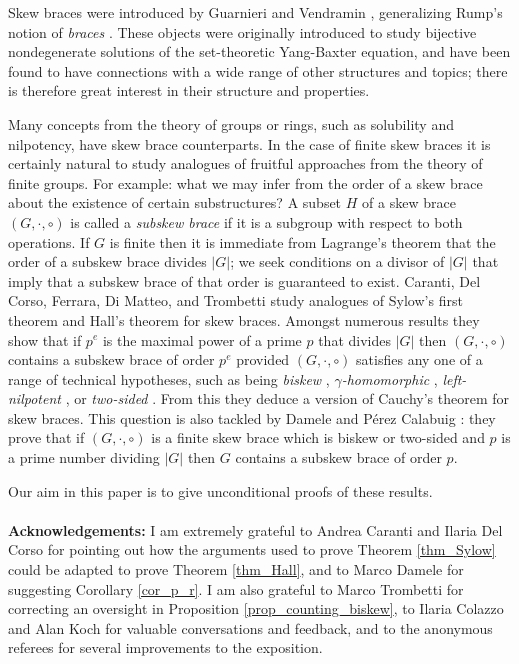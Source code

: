 \documentclass[12pt,a4paper, reqno]{amsart}
\theoremstyle{definition}
\begin{document}
Skew braces were introduced by Guarnieri and Vendramin \cite{GV17}, generalizing Rump's notion of \textit{braces} \cite{Ru07a}. These objects were originally introduced to study bijective nondegenerate solutions of the set-theoretic Yang-Baxter equation, and have been found to have connections with a wide range of other structures and topics; there is therefore great interest in their structure and properties. 

Many concepts from the theory of groups or rings, such as solubility and nilpotency, have skew brace counterparts. In the case of finite skew braces it is certainly natural to study analogues of fruitful approaches from the theory of finite groups. For example: what we may infer from the order of a skew brace about the existence of certain substructures? A subset $ H $ of a skew brace $ (G,\cdot,\circ) $ is called a \textit{subskew brace} if it is a subgroup with respect to both operations. If $ G $ is finite then it is immediate from Lagrange's theorem that the order of a subskew brace divides $ |G| $; we seek conditions on a divisor of $ |G| $ that imply that a subskew brace of that order is guaranteed to exist. Caranti, Del Corso, Ferrara, Di Matteo, and Trombetti \cite{CCMFT25} study analogues of Sylow's first theorem and Hall's theorem for skew braces. Amongst numerous results they show that if $ p^{e} $ is the maximal power of a prime $ p $ that divides $ |G| $ then $ (G,\cdot,\circ) $ contains a subskew brace of order $ p^{e} $ provided $ (G,\cdot,\circ) $ satisfies any one of a range of technical hypotheses, such as being \textit{biskew}  \cite{Ch19b}, \textit{$\gamma$-homomorphic} \cite{BNY22}, \textit{left-nilpotent} \cite{CSV19}, or \textit{two-sided} \cite{Tra23}. From this they deduce a version of Cauchy's theorem for skew braces. This question is also tackled by Damele and P\'{e}rez Calabuig \cite{DPC26}: they prove that if $ (G,\cdot,\circ) $ is a finite skew brace which is biskew or two-sided and $ p $ is a prime number dividing $ |G| $ then $ G $ contains a subskew brace of order $ p $. 

Our aim in this paper is to give unconditional proofs of these results. 
\\ \\
\textbf{Acknowledgements:} I am extremely grateful to Andrea Caranti and Ilaria Del Corso for pointing out how the arguments used to prove Theorem \ref{thm_Sylow} could be adapted to prove Theorem \ref{thm_Hall}, and to Marco Damele for suggesting Corollary \ref{cor_p_r}. I am also grateful to Marco Trombetti for correcting an oversight in Proposition \ref{prop_counting_biskew}, to Ilaria Colazzo and Alan Koch for valuable conversations and feedback, and to the anonymous referees for several improvements to the exposition. 
\end{document}
